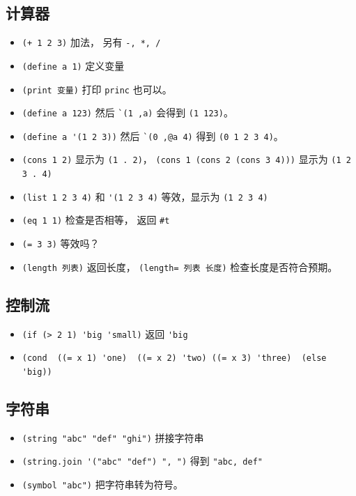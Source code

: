 \subsection{计算器}
\begin{itemize}
\item \verb`(+ 1 2 3)` 加法， 另有 \verb`-, *, /`
\item \verb`(define a 1)` 定义变量
\item \verb`(print 变量)` 打印 \verb`princ` 也可以。
\item \verb`(define a 123)` 然后 \verb|`(1 ,a)| 会得到 \verb`(1 123)`。
\item \verb`(define a '(1 2 3))` 然后 \verb|`(0 ,@a 4)| 得到 \verb`(0 1 2 3 4)`。
\item \verb`(cons 1 2)` 显示为 \verb`(1 . 2)`， \verb`(cons 1 (cons 2 (cons 3 4)))` 显示为 \verb`(1 2 3 . 4)`
\item \verb`(list 1 2 3 4)` 和 \verb`'(1 2 3 4)` 等效，显示为 \verb`(1 2 3 4)`
\item \verb`(eq 1 1)` 检查是否相等， 返回 \verb`#t`
\item \verb`(= 3 3)` 等效吗？
\item \verb`(length 列表)` 返回长度， \verb`(length= 列表 长度)` 检查长度是否符合预期。
\end{itemize}

\subsection{控制流}
\begin{itemize}
\item \verb`(if (> 2 1) 'big 'small)` 返回 \verb`'big`
\item \verb`(cond  ((= x 1) 'one)  ((= x 2) 'two) ((= x 3) 'three)  (else 'big))`
\end{itemize}

\subsection{字符串}
\begin{itemize}
\item \verb`(string "abc" "def" "ghi")` 拼接字符串
\item \verb`(string.join '("abc" "def") ", ")` 得到 \verb`"abc, def"`
\item \verb`(symbol "abc")` 把字符串转为符号。
\end{itemize}


